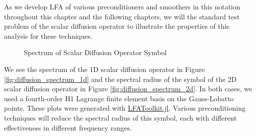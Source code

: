 As we develop LFA of various preconditioners and smoothers in this notation throughout this chapter and the following chapters, we will the standard test problem of the scalar diffusion operator to illustrate the properties of this analysis for these techniques.

\begin{figure}[!h]
  \centering
  \hfill
  \caption{Spectrum of Scalar Diffusion Operator Symbol}
\end{figure}

We see the spectrum of the 1D scalar diffusion operator in Figure \ref{fig:diffusion_spectrum_1d} and the spectral radius of the symbol of the 2D scalar diffusion operator in Figure \ref{fig:diffusion_spectrum_2d}.
In both cases, we used a fourth-order H1 Lagrange finite element basis on the Gauss-Lobatto points.
These plots were generated with \href{https://www.github.com/jeremylt/LFAToolkit.jl}{LFAToolkit.jl}.
Various preconditioning techniques will reduce the spectral radius of this symbol, each with different effectiveness in different frequency ranges.
